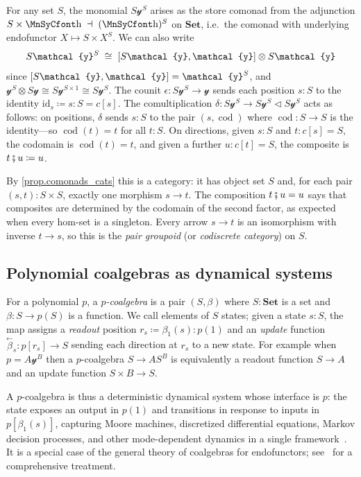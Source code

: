 \documentclass[11pt, oneside, article]{memoir}
\theoremstyle{definition}
\theoremstyle{plain}
\newenvironment{example}
  {\pushQED{\qed}\renewcommand{\qedsymbol}{$\lozenge$}\examplex}
  {\popQED\endexamplex}
\DeclarePairedDelimiter{\ihom}{[}{]}
\DeclareMathOperator{\cod}{cod}
\newcommand{\Cat}[1]{\mathbf{#1}}%
\newcommand{\id}{\mathrm{id}}
\newcommand{\then}{\mathbin{\fatsemi}}
\newcommand{\bk}[1]{\overset{\scriptscriptstyle\leftarrow}{#1}}
\newcommand{\smset}{\Cat{Set}}
\newcommand{\yon}{\mathcal{y}}
\newcommand{\tri}{\mathbin{\triangleleft}}
\newcommand{\smallsquare}{\mbox{\MnSyCfont\symbol{"68}}}
\newcommand{\blank}{\mathord{\smallsquare}}
\begin{document}
\begin{example}[The store comonad and the pair groupoid]\label{ex.store}
For any set $S$, the monomial $S\yon^S$ arises as the store comonad from the adjunction $S\times\blank\;\dashv\;(\blank)^S$ on $\smset$, i.e.\ the comonad with underlying endofunctor $X\mapsto S\times X^S$. We can also write
\begin{equation}\label{eqn.store_decomp}
S\yon^S\;\cong\;\ihom{S\yon,\yon}\otimes S\yon
\end{equation}
since $\ihom{S\yon,\yon}=\yon^S$, and $\yon^S\otimes S\yon\cong S\yon^{S\times 1}\cong S\yon^S$. The counit $\epsilon\colon S\yon^S\to\yon$ sends each position $s:S$ to the identity $\id_s\coloneqq s:S=c[s]$. The comultiplication $\delta\colon S\yon^S\to S\yon^S\tri S\yon^S$ acts as follows: on positions, $\delta$ sends $s:S$ to the pair $(s,\cod)$ where $\cod\colon S\to S$ is the identity---so $\cod(t)=t$ for all $t:S$. On directions, given $s:S$ and $t:c[s]=S$, the codomain is $\cod(t)=t$, and given a further $u:c[t]=S$, the composite is $t\then u\coloneqq u$.

By \cref{prop.comonads_cats} this is a category: it has object set $S$ and, for each pair $(s,t):S\times S$, exactly one morphism $s\to t$. The composition $t\then u=u$ says that composites are determined by the codomain of the second factor, as expected when every hom-set is a singleton. Every arrow $s\to t$ is an isomorphism with inverse $t\to s$, so this is the \emph{pair groupoid} (or \emph{codiscrete category}) on $S$.
\end{example}



\subsection{Polynomial coalgebras as dynamical systems}\label{sec.coalgebras}

For a polynomial $p$, a \emph{$p$-coalgebra} is a pair $(S,\beta)$ where $S:\smset$ is a set and $\beta\colon S\to p(S)$ is a function. We call elements of $S$ states; given a state $s:S$, the map assigns a \emph{readout} position $r_s\coloneqq\beta_1(s):p(1)$ and an \emph{update} function $\bk{\beta}_s\colon p[r_s]\to S$ sending each direction at $r_s$ to a new state. For example when $p=A\yon^B$ then a $p$-coalgebra $S\to AS^B$ is equivalently a readout function $S\to A$ and an update function $S\times B\to S$.

A $p$-coalgebra is thus a deterministic dynamical system whose interface is $p$: the state exposes an output in $p(1)$ and transitions in response to inputs in $p[\beta_1(s)]$, capturing Moore machines, discretized differential equations, Markov decision processes, and other mode-dependent dynamics in a single framework~\cite{niu2025polynomial}. It is a special case of the general theory of coalgebras for endofunctors; see~\cite{jacobs2017introduction} for a comprehensive treatment.
\end{document}

